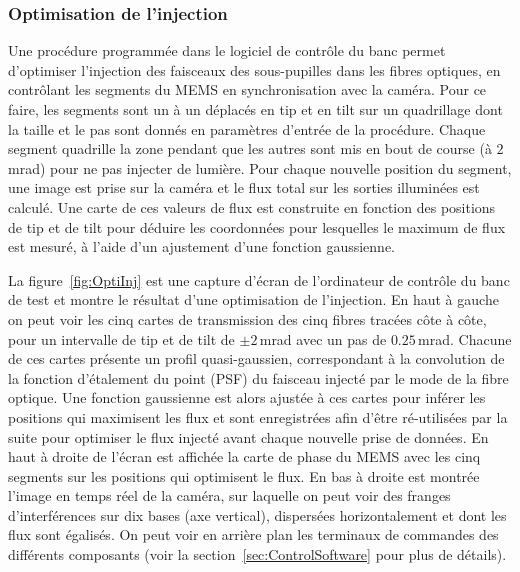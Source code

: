\subsubsection{Optimisation de l'injection}
\label{sec:OptiInj}

Une procédure programmée dans le logiciel de contrôle du banc permet d'optimiser l'injection des faisceaux des sous-pupilles dans les fibres optiques, en contrôlant les segments du \ac{MEMS} en synchronisation avec la caméra. Pour ce faire, les segments sont un à un déplacés en tip et en tilt sur un quadrillage dont la taille et le pas sont donnés en paramètres d'entrée de la procédure. Chaque segment quadrille la zone pendant que les autres sont mis en bout de course (à $2 \,$mrad) pour ne pas injecter de lumière. Pour chaque nouvelle position du segment, une image est prise sur la caméra et le flux total sur les sorties illuminées est calculé. Une carte de ces valeurs de flux est construite en fonction des positions de tip et de tilt pour déduire les coordonnées pour lesquelles le maximum de flux est mesuré, à l'aide d'un ajustement d'une fonction gaussienne. 

La figure~\ref{fig:OptiInj} est une capture d'écran de l'ordinateur de contrôle du banc de test et montre le résultat d'une optimisation de l'injection. En haut à gauche on peut voir les cinq cartes de transmission des cinq fibres tracées côte à côte, pour un intervalle de tip et de tilt de $\pm 2 \,$mrad avec un pas de $0.25 \,$mrad. Chacune de ces cartes présente un profil quasi-gaussien, correspondant à la convolution de la fonction d'étalement du point (\ac{PSF}) du faisceau injecté par le mode de la fibre optique. Une fonction gaussienne est alors ajustée à ces cartes pour inférer les positions qui maximisent les flux et sont enregistrées afin d'être ré-utilisées par la suite pour optimiser le flux injecté avant chaque nouvelle prise de données. En haut à droite de l'écran est affichée la carte de phase du \ac{MEMS} avec les cinq segments sur les positions qui optimisent le flux. En bas à droite est montrée l'image en temps réel de la caméra, sur laquelle on peut voir des franges d'interférences sur dix bases (axe vertical), dispersées horizontalement et dont les flux sont égalisés. On peut voir en arrière plan les terminaux de commandes des différents composants (voir la section~\ref{sec:ControlSoftware} pour plus de détails).

